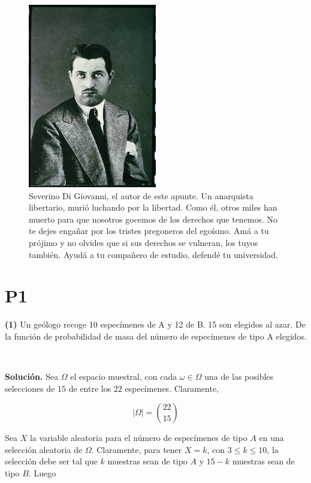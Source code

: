 \documentclass[a4paper, 12pt]{article}
\begin{document}
 \begin{figure}[h!]
 \centering
  \includegraphics[width=0.5\textwidth]{../Images/SeverinoDiGiovanni.jpg}
 \caption{Severino Di Giovanni, el autor de este apunte. Un anarquista
   libertario, murió luchando por la libertad. Como él, otros miles han muerto
   para que nosotros gocemos de los derechos que tenemos. No te dejes engañar
   por los tristes pregoneros del egoísmo. Amá a tu prójimo y no olvides que si
   sus derechos se vulneran, los tuyos también. Ayudá a tu compañero de estudio,
 defendé tu universidad. }
 \end{figure}

\pagebreak
\tableofcontents
\newpage


\section{P1} 

\begin{myframe}
\textbf{(1)} Un geólogo recoge 10 especímenes de A y 12 de B. 15 son elegidos
al azar. De la función de probabilidad de masa del número de especímenes de tipo
A elegidos.
\end{myframe}
~


\textbf{Solución.} Sea $\Omega$ el espacio muestral, con cada $\omega \in \Omega$ una de las
posibles selecciones de $15$ de entre los $22$ especímenes. Claramente,

\begin{equation*}
  \left| \Omega \right| = \binom{22}{15}
\end{equation*}

Sea $X$ la variable aleatoria para el número de especímenes de tipo $A$ en una
selección aleatoria de $\Omega$. Claramente, para tener $X = k$, con $3 \leq k
\leq 10$, la selección debe ser tal que $k$ muestras sean de tipo $A$ y $15 - k$
muestras sean de tipo $B$. Luego 
\end{document}
